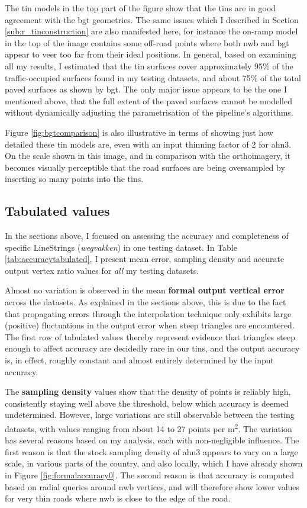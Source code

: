 The \ac{tin} models in the top part of the figure show that the \ac{tin}s are in good agreement with the \ac{bgt} geometries. The same issues which I described in Section \ref{sub:r_tinconstruction} are also manifested here, for instance the on-ramp model in the top of the image contains some off-road points where both \ac{nwb} and \ac{bgt} appear to veer too far from their ideal positions. In general, based on examining all my results, I estimated that the \ac{tin} surfaces cover approximately 95\% of the traffic-occupied surfaces found in my testing datasets, and about 75\% of the total paved surfaces as shown by \ac{bgt}. The only major issue appears to be the one I mentioned above, that the full extent of the paved surfaces cannot be modelled without dynamically adjusting the parametrisation of the pipeline's algorithms.

Figure \ref{fig:bgtcomparison} is also illustrative in terms of showing just how detailed these \ac{tin} models are, even with an input thinning factor of 2 for \ac{ahn3}. On the scale shown in this image, and in comparison with the orthoimagery, it becomes visually perceptible that the road surfaces are being oversampled by inserting so many points into the \ac{tin}s.

\subsection{Tabulated values}
\label{sub:accuracytabulated}

In the sections above, I focused on assessing the accuracy and completeness of specific LineStrings (\textit{wegvakken}) in one testing dataset. In Table \ref{tab:accuracytabulated}, I present mean error, sampling density and accurate output vertex ratio values for \textit{all} my testing datasets.

Almost no variation is observed in the mean \textbf{formal output vertical error} across the datasets. As explained in the sections above, this is due to the fact that propagating errors through the interpolation technique only exhibits large (positive) fluctuations in the output error when steep triangles are encountered. The first row of tabulated values thereby represent evidence that triangles steep enough to affect accuracy are decidedly rare in our \ac{tin}s, and the output accuracy is, in effect, roughly constant and almost entirely determined by the input accuracy.

The \textbf{sampling density} values show that the density of points is reliably high, consistently staying well above the threshold, below which accuracy is deemed undetermined. However, large variations are still observable between the testing datasets, with values ranging from about 14 to 27 points per m\textsuperscript{2}. The variation has several reasons based on my analysis, each with non-negligible influence. The first reason is that the stock sampling density of \ac{ahn3} appears to vary on a large scale, in various parts of the country, and also locally, which I have already shown in Figure \ref{fig:formalaccuracy0}. The second reason is that accuracy is computed based on radial queries around \ac{nwb} vertices, and will therefore show lower values for very thin roads where \ac{nwb} is close to the edge of the road.

